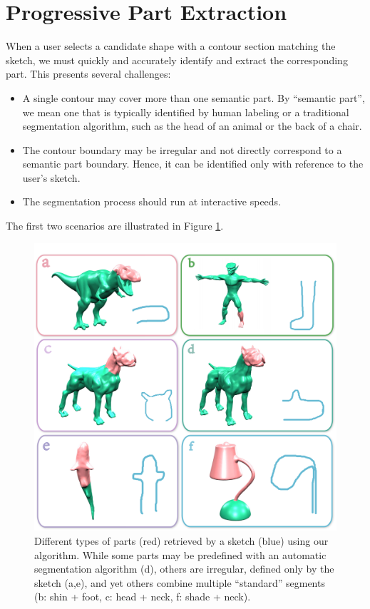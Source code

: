 
\section{Progressive Part Extraction}\label{sec:partextraction}
When a user selects a candidate shape with a contour section matching the sketch, we must quickly and accurately identify and extract the corresponding part. This presents several challenges:
%
\begin{itemize}
\item A single contour may cover more than one semantic part. By ``semantic part'', we mean one that is typically identified by human labeling or a traditional segmentation algorithm, such as the head of an animal or the back of a chair.
\item The contour boundary may be irregular and not directly correspond to a semantic part boundary. Hence, it can be identified only with reference to the user's sketch.
\item The segmentation process should run at interactive speeds.
\end{itemize}
%
The first two scenarios are illustrated in Figure \ref{fig:partseg}.
%
\begin{figure}\centering
\includegraphics[width=\linewidth]{./Material/IrreWay.pdf}
\caption{Different types of parts (red) retrieved by a sketch (blue) using our algorithm. While some parts may be predefined with an automatic segmentation algorithm (d), others are irregular, defined only by the sketch (a,e), and yet others combine multiple ``standard'' segments (b: shin + foot, c: head + neck, f: shade + neck).}\label{fig:partseg}
\end{figure}

